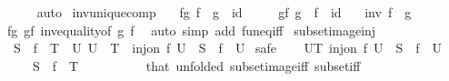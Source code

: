\begin{isabellebody}
\ \ \ \ \isamarkupfalse%
\ auto\isanewline
{}\isamarkupfalse%
%
\endisatagproof
{\isafoldproof}%
%
\isadelimproof
\isanewline
%
\endisadelimproof
\isanewline
{}\isamarkupfalse%
\ inv{\isacharunderscore}{\kern0pt}unique{\isacharunderscore}{\kern0pt}comp{\isacharcolon}{\kern0pt}\isanewline
\ \ \ fg{\isacharcolon}{\kern0pt}\ {\isachardoublequoteopen}f\ {\isasymcirc}\ g\ {\isacharequal}{\kern0pt}\ id{\isachardoublequoteclose}\isanewline
\ \ \ \ \ gf{\isacharcolon}{\kern0pt}\ {\isachardoublequoteopen}g\ {\isasymcirc}\ f\ {\isacharequal}{\kern0pt}\ id{\isachardoublequoteclose}\isanewline
\ \ \ {\isachardoublequoteopen}inv\ f\ {\isacharequal}{\kern0pt}\ g{\isachardoublequoteclose}\isanewline
%
\isadelimproof
\ \ %
\endisadelimproof
%
\isatagproof
{}\isamarkupfalse%
\ fg\ gf\ inv{\isacharunderscore}{\kern0pt}equality{\isacharbrackleft}{\kern0pt}of\ g\ f{\isacharbrackright}{\kern0pt}\ \isamarkupfalse%
\ {\isacharparenleft}{\kern0pt}auto\ simp\ add{\isacharcolon}{\kern0pt}\ fun{\isacharunderscore}{\kern0pt}eq{\isacharunderscore}{\kern0pt}iff{\isacharparenright}{\kern0pt}%
\endisatagproof
{\isafoldproof}%
%
\isadelimproof
\isanewline
%
\endisadelimproof
\isanewline
{}\isamarkupfalse%
\ subset{\isacharunderscore}{\kern0pt}image{\isacharunderscore}{\kern0pt}inj{\isacharcolon}{\kern0pt}\isanewline
\ \ {\isachardoublequoteopen}S\ {\isasymsubseteq}\ f\ {\isacharbackquote}{\kern0pt}\ T\ {\isasymlongleftrightarrow}\ {\isacharparenleft}{\kern0pt}{\isasymexists}U{\isachardot}{\kern0pt}\ U\ {\isasymsubseteq}\ T\ {\isasymand}\ inj{\isacharunderscore}{\kern0pt}on\ f\ U\ {\isasymand}\ S\ {\isacharequal}{\kern0pt}\ f\ {\isacharbackquote}{\kern0pt}\ U{\isacharparenright}{\kern0pt}{\isachardoublequoteclose}\isanewline
%
\isadelimproof
%
\endisadelimproof
%
\isatagproof
{}\isamarkupfalse%
\ safe\isanewline
\ \ \isamarkupfalse%
\ {\isachardoublequoteopen}{\isasymexists}U{\isasymsubseteq}T{\isachardot}{\kern0pt}\ inj{\isacharunderscore}{\kern0pt}on\ f\ U\ {\isasymand}\ S\ {\isacharequal}{\kern0pt}\ f\ {\isacharbackquote}{\kern0pt}\ U{\isachardoublequoteclose}\isanewline
\ \ \ \ \ {\isachardoublequoteopen}S\ {\isasymsubseteq}\ f\ {\isacharbackquote}{\kern0pt}\ T{\isachardoublequoteclose}\isanewline
\ \ \isamarkupfalse%
\ {\isacharminus}{\kern0pt}\isanewline
\ \ \ \ \isamarkupfalse%
\ that\ {\isacharbrackleft}{\kern0pt}unfolded\ subset{\isacharunderscore}{\kern0pt}image{\isacharunderscore}{\kern0pt}iff\ subset{\isacharunderscore}{\kern0pt}iff{\isacharbrackright}{\kern0pt}\isanewline

\end{isabellebody}
